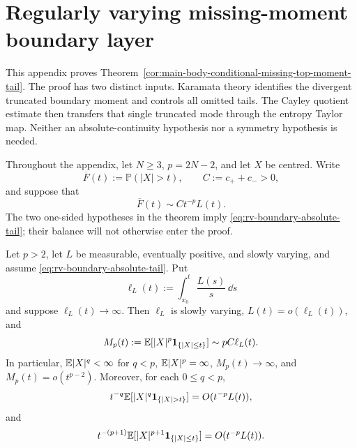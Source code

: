 \section{Regularly varying missing-moment boundary layer}%
\label{app:conditional-missing-top-moment-tails}

This appendix proves
Theorem~\ref{cor:main-body-conditional-missing-top-moment-tail}.  The proof
has two distinct inputs.  Karamata theory identifies the divergent truncated
boundary moment and controls all omitted tails.  The Cayley quotient estimate
then transfers that single truncated mode through the entropy Taylor map.
Neither an absolute-continuity hypothesis nor a symmetry hypothesis is
needed.

Throughout the appendix, let \(N\ge3\), \(p=2N-2\), and let \(X\) be
centred.  Write
\[
 \overline F(t):=\mathbb P(|X|>t),\qquad
 C:=c_++c_->0,
\]
and suppose that
\begin{equation}\label{eq:rv-boundary-absolute-tail}
 \overline F(t)\sim Ct^{-p}L(t).
\end{equation}
The two one-sided hypotheses in the theorem imply
\eqref{eq:rv-boundary-absolute-tail}; their balance will not otherwise enter
the proof.

\begin{lemma}%
\label{lem:rv-boundary-moment-package}
Let \(p>2\), let \(L\) be measurable, eventually positive, and slowly
varying, and assume \eqref{eq:rv-boundary-absolute-tail}.  Put
\[
 \ell_L(t):=\int_{x_0}^t\frac{L(s)}s\,\dd s
\]
and suppose \(\ell_L(t)\to\infty\).  Then \(\ell_L\) is slowly
varying, \(L(t)=o(\ell_L(t))\), and
\begin{equation}\label{eq:rv-truncated-p-moment}
 M_p(t):=\mathbb{E}[|X|^p\mathbf1_{\{|X|\le t\}}]
 \sim pC\ell_L(t).
\end{equation}
In particular, \(\mathbb{E}|X|^q<\infty\) for \(q<p\),
\(\mathbb{E}|X|^p=\infty\), \(M_p(t)\to\infty\), and
\(M_p(t)=o(t^{p-2})\).  Moreover, for each \(0\le q<p\),
\begin{equation}\label{eq:rv-lower-omitted-tail}
 t^{-q}\EE[|X|^q\mathbf1_{\{|X|>t\}}]
 =O(t^{-p}L(t)),
\end{equation}
and
\begin{equation}\label{eq:rv-local-p-plus-one}
 t^{-(p+1)}
 \mathbb{E}[|X|^{p+1}\mathbf1_{\{|X|\le t\}}]
 =O(t^{-p}L(t)).
\end{equation}
\end{lemma}

